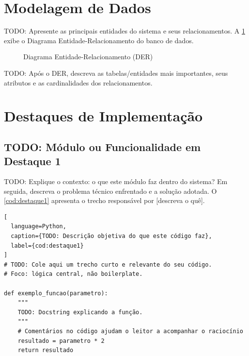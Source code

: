 \section{Modelagem de Dados}
\label{sec:modelagem-dados}

TODO: Apresente as principais entidades do sistema e seus relacionamentos.
A \cref{fig:der} exibe o Diagrama Entidade-Relacionamento do banco de dados.

\begin{figure}[H]
  \caption{Diagrama Entidade-Relacionamento (DER)}
  \label{fig:der}
  \centering
  \fbox{\rule{0pt}{7cm}\rule{0.9\textwidth}{0pt}} %
\end{figure}

TODO: Após o DER, descreva as tabelas/entidades mais importantes,
seus atributos e as cardinalidades dos relacionamentos.


\section{Destaques de Implementação}
\label{sec:destaques}


\subsection{TODO: Módulo ou Funcionalidade em Destaque 1}
\label{subsec:destaque1}

TODO: Explique o contexto: o que este módulo faz dentro do sistema?
Em seguida, descreva o problema técnico enfrentado e a solução adotada.
O \cref{cod:destaque1} apresenta o trecho responsável por [descreva o quê].

\begin{lstlisting}[
  language=Python,
  caption={TODO: Descrição objetiva do que este código faz},
  label={cod:destaque1}
]
# TODO: Cole aqui um trecho curto e relevante do seu código.
# Foco: lógica central, não boilerplate.

def exemplo_funcao(parametro):
    """
    TODO: Docstring explicando a função.
    """
    # Comentários no código ajudam o leitor a acompanhar o raciocínio
    resultado = parametro * 2
    return resultado
\end{lstlisting}

